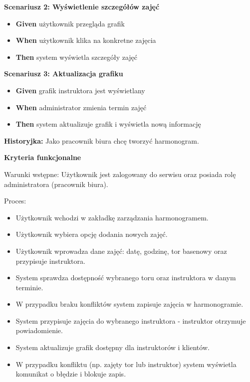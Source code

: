 \documentclass[a4paper,12pt]{article}
\begin{document}
\textbf{Scenariusz 2: Wyświetlenie szczegółów zajęć}
\begin{itemize}
    \item \textbf{Given} użytkownik przegląda grafik
    \item \textbf{When} użytkownik klika na konkretne zajęcia
    \item \textbf{Then} system wyświetla szczegóły zajęć
\end{itemize}

\textbf{Scenariusz 3: Aktualizacja grafiku}
\begin{itemize}
    \item \textbf{Given} grafik instruktora jest wyświetlany
    \item \textbf{When} administrator zmienia termin zajęć
    \item \textbf{Then} system aktualizuje grafik i wyświetla nową informację
\end{itemize}

\noindent \textbf{Historyjka:} Jako pracownik biura chcę tworzyć harmonogram.

\vspace{0,2cm}

\noindent \textbf{Kryteria funkcjonalne}

\vspace{0,2cm}

\noindent Warunki wstępne: Użytkownik jest zalogowany do serwisu oraz posiada rolę administratora (pracownik biura).

\vspace{0,2cm}

\noindent Proces:

\begin{itemize}
    \item Użytkownik wchodzi w zakładkę zarządzania harmonogramem.
    \item Użytkownik wybiera opcję dodania nowych zajęć.
    \item Użytkownik wprowadza dane zajęć: datę, godzinę, tor basenowy oraz przypisuje instruktora.
    \item System sprawdza dostępność wybranego toru oraz instruktora w danym terminie.
    \item W przypadku braku konfliktów system zapisuje zajęcia w harmonogramie.
    \item System przypisuje zajęcia do wybranego instruktora - instruktor otrzymuje powiadomienie.
    \item System aktualizuje grafik dostępny dla instruktorów i klientów.
    \item W przypadku konfliktu (np. zajęty tor lub instruktor) system wyświetla komunikat o błędzie i blokuje zapis.
\end{itemize}
\end{document}
